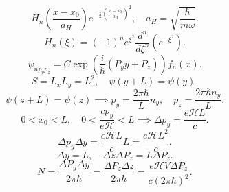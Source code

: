\documentclass[a4paper]{article}
\begin{document}
\begin{sol}
\[	H_n\left( \frac{x-x_0}{a_H} \right) e^{-\frac{1}{2} \left( \frac{x-x_0}{a_H} \right) ^2},\quad a_H= \sqrt{\frac{\hbar}{m\omega}} 
.\] 
\[
	H_n(\xi)= (-1)^n e^{\xi^2} \frac{d^n}{d\xi^n} \left( e^{-\xi^2} \right) 
.\]
\[
	\psi_{np_y p_z}= C \exp \left( \frac{i}{\hbar }\left( P_y y+P_z \right)  \right) f_n(x)
.\] 
\[
	S=L_x L_y=L^2,\quad \psi(y+L)=\psi(y)
.\] 
\[
	\psi(z+L)= \psi(z) \implies p_y = \frac{2\pi \hbar }{L}n_y,\quad p_z= \frac{2\pi \hbar n_y}{L}
.\] 
\[
	0<x_0<L,\quad 0< \frac{c p_y}{e\mathcal{H}}<L\implies
	\Delta p_y= \frac{e\mathcal{H} L}{c}
.\] 
\[
	\Delta p_y \Delta y= \frac{e\mathcal{H} L}{c} L=
	\frac{e \mathcal{H} L^2}{c}
.\] 
\[
\Delta y=L,\quad \Delta z \Delta P_z= L\Delta P_z
.\] 
\[
	N= \frac{\Delta P_y \Delta y}{2\pi \hbar }= \frac{\Delta P_z \Delta z}{2\pi \hbar }= \frac{e \mathcal{H} V \Delta P_z}{c(2\pi \hbar)^2}
.\] 
 
\end{sol}
\end{document}
